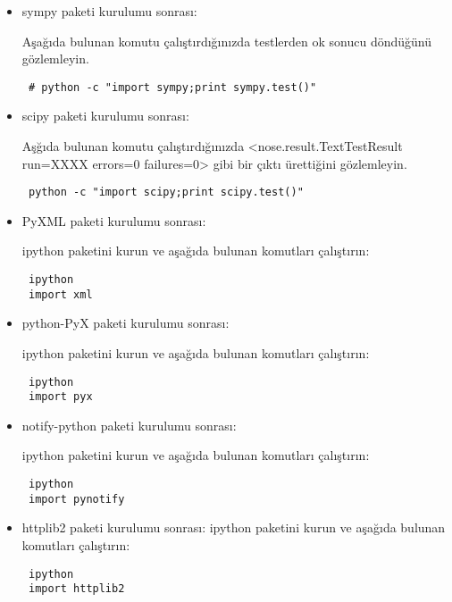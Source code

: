\documentclass[a4paper,10pt]{article}
\begin{document}
\begin{itemize}
\item sympy paketi kurulumu sonrası:

Aşağıda bulunan komutu çalıştırdığınızda testlerden ok sonucu döndüğünü gözlemleyin.
\begin{verbatim}
 # python -c "import sympy;print sympy.test()"
\end{verbatim}

\item scipy paketi kurulumu sonrası:

Aşğıda bulunan komutu çalıştırdığınızda <nose.result.TextTestResult run=XXXX errors=0 failures=0> gibi bir çıktı ürettiğini gözlemleyin.
\begin{verbatim}
 python -c "import scipy;print scipy.test()"
\end{verbatim}

\item PyXML paketi kurulumu sonrası:

ipython paketini kurun ve aşağıda bulunan komutları çalıştırın:
\begin{verbatim}
 ipython
 import xml
\end{verbatim}


\item python-PyX paketi kurulumu sonrası:

ipython paketini kurun ve aşağıda bulunan komutları çalıştırın:
\begin{verbatim}
 ipython
 import pyx
\end{verbatim}

\item notify-python paketi kurulumu sonrası:

ipython paketini kurun ve aşağıda bulunan komutları çalıştırın:
\begin{verbatim}
 ipython
 import pynotify
\end{verbatim}


\item httplib2 paketi kurulumu sonrası:
ipython paketini kurun ve aşağıda bulunan komutları çalıştırın:
\begin{verbatim}
 ipython
 import httplib2
\end{verbatim}


\end{itemize}
\end{document}
